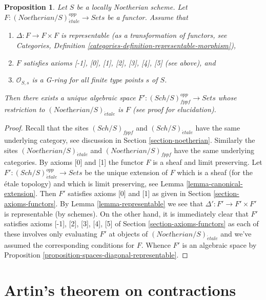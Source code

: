 \documentclass{stacks-project}
\theoremstyle{plain}
\newtheorem{proposition}[subsection]{Proposition}
\theoremstyle{definition}
\theoremstyle{remark}
\numberwithin{equation}{subsection}
\def\Sch{\mathit{Sch}}
\def\etale{{\acute{e}tale}}
\begin{document}
\begin{proposition}
\label{proposition-spaces-diagonal-representable-noetherian}
Let $S$ be a locally Noetherian scheme. Let
$F : (\textit{Noetherian}/S)_\etale^{opp} \to \textit{Sets}$
be a functor. Assume that
\begin{enumerate}
\item $\Delta : F \to F \times F$ is representable
(as a transformation of functors, see
Categories, Definition \ref{categories-definition-representable-morphism}),
\item $F$ satisfies axioms [-1], [0], [1], [2], [3], [4], [5]
(see above), and
\item $\mathcal{O}_{S, s}$ is a G-ring for all finite type points $s$ of $S$.
\end{enumerate}
Then there exists a unique algebraic space
$F' : (\Sch/S)_{fppf}^{opp} \to \textit{Sets}$
whose restriction to $(\textit{Noetherian}/S)_\etale$ is $F$
(see proof for elucidation).
\end{proposition}

\begin{proof}
Recall that the sites $(\Sch/S)_{fppf}$ and $(\Sch/S)_\etale$ have the same
underlying category, see discussion in Section \ref{section-noetherian}.
Similarly the sites $(\textit{Noetherian}/S)_\etale$ and
$(\textit{Noetherian}/S)_{fppf}$ have the same underlying categories.
By axioms [0] and [1] the functor $F$ is a sheaf and
limit preserving.
Let $F' : (\Sch/S)_\etale^{opp} \to \textit{Sets}$
be the unique extension of $F$ which is a sheaf (for the \'etale topology)
and which is limit preserving, see
Lemma \ref{lemma-canonical-extension}.
Then $F'$ satisfies axioms [0] and [1] as given in
Section \ref{section-axioms-functors}.
By Lemma \ref{lemma-representable} we see that
$\Delta' : F' \to F' \times F'$ is representable (by schemes).
On the other hand, it is immediately clear that
$F'$ satisfies axioms [-1], [2], [3], [4], [5] of
Section \ref{section-axioms-functors}
as each of these involves only evaluating $F'$ at objects
of $(\textit{Noetherian}/S)_\etale$ and we've assumed the
corresponding conditions for $F$.
Whence $F'$ is an algebraic space by
Proposition \ref{proposition-spaces-diagonal-representable}.
\end{proof}












\section{Artin's theorem on contractions}
\label{section-contractions}
\end{document}
